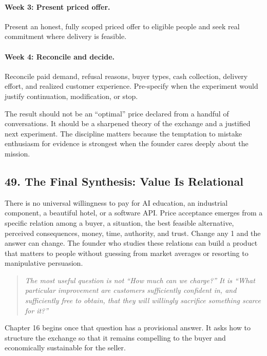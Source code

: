 \paragraph*{Week 3: Present priced offer.} Present an honest, fully scoped priced offer to eligible people and seek real commitment where delivery is feasible.

\paragraph*{Week 4: Reconcile and decide.} Reconcile paid demand, refusal reasons, buyer types, cash collection, delivery effort, and realized customer experience. Pre-specify when the experiment would justify continuation, modification, or stop.

The result should not be an ``optimal'' price declared from a handful of conversations. It should be a sharpened theory of the exchange and a justified next experiment. The discipline matters because the temptation to mistake enthusiasm for evidence is strongest when the founder cares deeply about the mission.

\subsection*{49. The Final Synthesis: Value Is Relational}

There is no universal willingness to pay for AI education, an industrial component, a beautiful hotel, or a software API. Price acceptance emerges from a specific relation among a buyer, a situation, the best feasible alternative, perceived consequences, money, time, authority, and trust. Change any 1 and the answer can change. The founder who studies these relations can build a product that matters to people without guessing from market averages or resorting to manipulative persuasion.

\begin{quote}
\itshape
The most useful question is not ``How much can we charge?'' It is ``What particular improvement are customers sufficiently confident in, and sufficiently free to obtain, that they will willingly sacrifice something scarce for it?''
\end{quote}

Chapter 16 begins once that question has a provisional answer. It asks how to structure the exchange so that it remains compelling to the buyer and economically sustainable for the seller.
